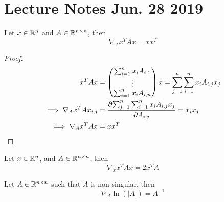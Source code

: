 \documentclass{article}
\begin{document}
    \section{Lecture Notes Jun. 28 2019}
        \begin{example}
            \begin{lemma}
                Let $x \in \mathbb{R}^n$ and $A \in \mathbb{R}^{n \times n}$, then
                \begin{equation}
                    \nabla_A x^T A x = x x^T
                \end{equation}
                \begin{proof}
                    \begin{align}
                        x^T A x &= 
                        \begin{pmatrix}
                            \sum_{i=1}^n x_i A_{i, 1} \\
                            \vdots \\
                            \sum_{i=1}^n x_i A_{i, n}
                        \end{pmatrix} x
                        = \sum_{j=1}^n \sum_{i=1}^n x_i A_{i, j} x_j \\
                        \implies \nabla_A x^T A x_{i, j} &= \frac{\partial{\sum_{j=1}^n \sum_{i=1}^n x_i A_{i, j} x_j}}{\partial{A_{i, j}}} = x_i x_j \\
                        \implies \nabla_A x^T A x &= x x^T
                    \end{align}
                \end{proof}
            \end{lemma}
            
            \begin{lemma}
                Let $x \in \mathbb{R}^n$, and $A \in \mathbb{R}^{n \times n}$, then
                \begin{equation}
                    \nabla_x x^T A x = 2 x^T A
                \end{equation}
            \end{lemma}
            
            \begin{lemma}
                Let $A \in \mathbb{R}^{n \times n}$ such that $A$ is non-singular, then
                \begin{equation}
                    \nabla_A \ln (|A|) = A^{-1}
                \end{equation}
            \end{lemma}
            

\end{example}
\end{document}

